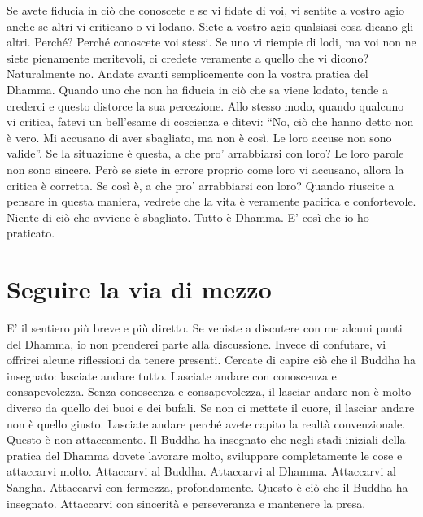 Se avete fiducia in ciò che conoscete e se vi fidate di voi, vi sentite
a vostro agio anche se altri vi criticano o vi lodano. Siete a vostro
agio qualsiasi cosa dicano gli altri. Perché? Perché conoscete voi
stessi. Se uno vi riempie di lodi, ma voi non ne siete pienamente
meritevoli, ci credete veramente a quello che vi dicono? Naturalmente
no. Andate avanti semplicemente con la vostra pratica del Dhamma. Quando
uno che non ha fiducia in ciò che sa viene lodato, tende a crederci e
questo distorce la sua percezione. Allo stesso modo, quando qualcuno vi
critica, fatevi un bell'esame di coscienza e ditevi: ``No, ciò che hanno
detto non è vero. Mi accusano di aver sbagliato, ma non è così. Le loro
accuse non sono valide''. Se la situazione è questa, a che pro'
arrabbiarsi con loro? Le loro parole non sono sincere. Però se siete in
errore proprio come loro vi accusano, allora la critica è corretta. Se
così è, a che pro' arrabbiarsi con loro? Quando riuscite a pensare in
questa maniera, vedrete che la vita è veramente pacifica e confortevole.
Niente di ciò che avviene è sbagliato. Tutto è Dhamma. E' così che io ho
praticato.

\section{Seguire la via di mezzo}

E' il sentiero più breve e più diretto. Se veniste a discutere con me
alcuni punti del Dhamma, io non prenderei parte alla discussione. Invece
di confutare, vi offrirei alcune riflessioni da tenere presenti. Cercate
di capire ciò che il Buddha ha insegnato: lasciate andare tutto.
Lasciate andare con conoscenza e consapevolezza. Senza conoscenza e
consapevolezza, il lasciar andare non è molto diverso da quello dei buoi
e dei bufali. Se non ci mettete il cuore, il lasciar andare non è quello
giusto. Lasciate andare perché avete capito la realtà convenzionale.
Questo è non-attaccamento. Il Buddha ha insegnato che negli stadi
iniziali della pratica del Dhamma dovete lavorare molto, sviluppare
completamente le cose e attaccarvi molto. Attaccarvi al Buddha.
Attaccarvi al Dhamma. Attaccarvi al Sangha. Attaccarvi con fermezza,
profondamente. Questo è ciò che il Buddha ha insegnato. Attaccarvi con
sincerità e perseveranza e mantenere la presa.

